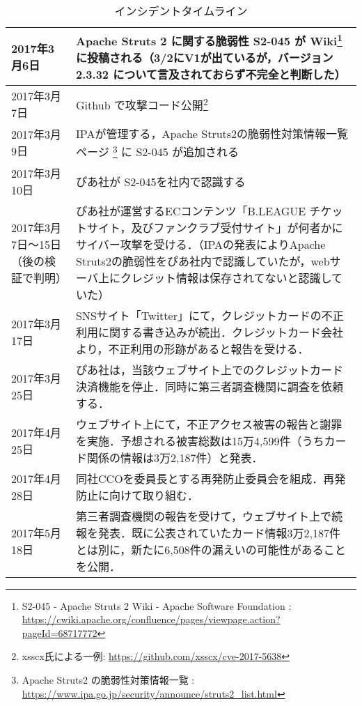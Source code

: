 
\begin{savenotes}
\begin{table}[htbp]
    \centering
    \caption{インシデントタイムライン}
    \label{tab:incident_timeline}
    \begin{tabular}{|l|p{8cm}|}
    \hline
    2017年3月6日 & Apache Struts 2 に関する脆弱性 S2-045 が Wiki\footnote{
        S2-045 - Apache Struts 2 Wiki - Apache Software Foundation
        : \url{https://cwiki.apache.org/confluence/pages/viewpage.action?pageId=68717772}
    }
    に投稿される（3/2にV1が出ているが，バージョン 2.3.32 について言及されておらず不完全と判断した） \\ \hline
    2017年3月7日 & Github で攻撃コード公開\footnote{
        xsscx氏による一例: \url{https://github.com/xsscx/cve-2017-5638}
    } \\ \hline
    2017年3月9日 & IPAが管理する，Apache Struts2の脆弱性対策情報一覧ページ
    \footnote{
        Apache Struts2 の脆弱性対策情報一覧
        : \url{https://www.ipa.go.jp/security/announce/struts2_list.html}
    }
    に S2-045 が追加される \\ \hline
    2017年3月10日 & ぴあ社が S2-045を社内で認識する \\ \hline
    2017年3月7日～15日（後の検証で判明） & ぴあ社が運営するECコンテンツ「B.LEAGUE チケットサイト，及びファンクラブ受付サイト」が何者かにサイバー攻撃を受ける．（IPAの発表によりApache Struts2の脆弱性をぴあ社内で認識していたが，webサーバ上にクレジット情報は保存されてないと認識していた） \\ \hline
    2017年3月17日 & SNSサイト「Twitter」にて，クレジットカードの不正利用に関する書き込みが続出．クレジットカード会社より，不正利用の形跡があると報告を受ける． \\ \hline
    2017年3月25日 & ぴあ社は，当該ウェブサイト上でのクレジットカード決済機能を停止．同時に第三者調査機関に調査を依頼する． \\ \hline
    2017年4月25日 & ウェブサイト上にて，不正アクセス被害の報告と謝罪を実施．予想される被害総数は15万4,599件（うちカード関係の情報は3万2,187件）と発表． \\ \hline
    2017年4月28日 & 同社CCOを委員長とする再発防止委員会を組成．再発防止に向けて取り組む． \\ \hline
    2017年5月18日 & 第三者調査機関の報告を受けて，ウェブサイト上で続報を発表．既に公表されていたカード情報3万2,187件とは別に，新たに6,508件の漏えいの可能性があることを公開． \\ \hline
    \end{tabular}
\end{table}
\end{savenotes}
